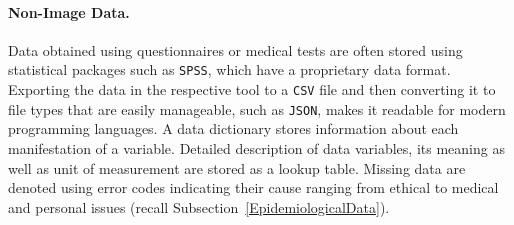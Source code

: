 \documentclass[journal]{style/vgtc} 			          %
\begin{document}
\paragraph{Non-Image Data. }
%
%
Data obtained using questionnaires or medical tests are often stored using statistical packages such as \texttt{SPSS}, which have a proprietary data format. %
%
Exporting the data in the respective tool to a \texttt{CSV} file and then converting it to file types that are easily manageable, such as \texttt{JSON}, makes it readable for modern programming languages.
%
%
A data dictionary stores information about each manifestation of a variable.
%
Detailed description of data variables, its meaning as well as unit of measurement are stored as a lookup table.
%
%
Missing data are denoted using error codes indicating their cause ranging from ethical to medical and personal issues (recall Subsection~\ref{EpidemiologicalData}).
%
\end{document}
